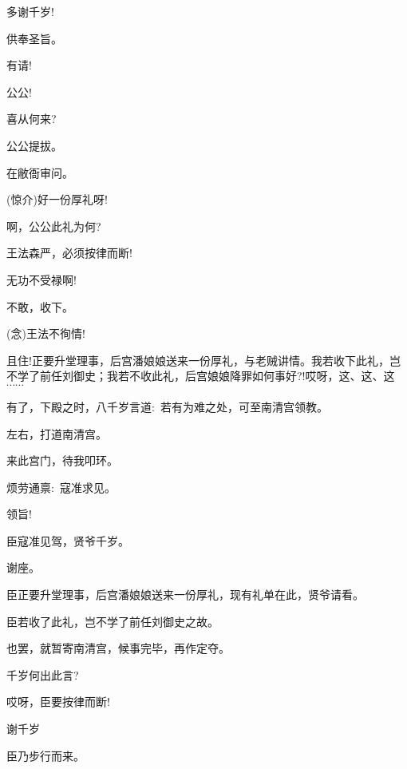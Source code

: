 {{多谢千岁!}


\vspace{5pt}


{供奉圣旨。}

{有请!}

{公公!}

{喜从何来?}

{公公提拔。}

{在敝衙审问。}

{({\hwfs 惊介})好一份厚礼呀!}

{啊，公公此礼为何?}

{王法森严，必须按律而断!}

{无功不受禄啊!}

{不敢，收下。}

{({\akai 念})王法不徇情!}

{且住!正要升堂理事，后宫潘娘娘送来一份厚礼，与老贼讲情。我若收下此礼，岂不学了前任刘御史；我若不收此礼，后宫娘娘降罪如何事好?!哎呀，这、这、这$\cdots{}\cdots{}$}

{有了，下殿之时，八千岁言道:~若有为难之处，可至南清宫领教。}

{左右，打道南清宫。}

\vspace{5pt}


{来此宫门，待我叩环。}

{烦劳通禀:~寇准求见。}

{领旨!}

{臣寇准见驾，贤爷千岁。}

{谢座。}

{臣正要升堂理事，后宫潘娘娘送来一份厚礼，现有礼单在此，贤爷请看。}

{臣若收了此礼，岂不学了前任刘御史之故。}

{也罢，就暂寄南清宫，候事完毕，再作定夺。}

{千岁何出此言?}

{哎呀，臣要按律而断!}

{谢千岁}

{臣乃步行而来。}

}
